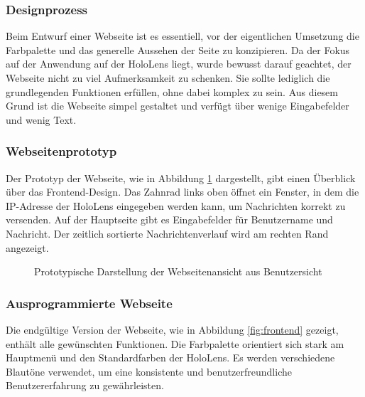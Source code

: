 \subsubsection{Designprozess}
Beim Entwurf einer Webseite ist es essentiell, vor der eigentlichen Umsetzung die Farbpalette und das generelle Aussehen
der Seite zu konzipieren. Da der Fokus auf der Anwendung auf der HoloLens liegt, wurde bewusst darauf geachtet, der
Webseite nicht zu viel Aufmerksamkeit zu schenken. Sie sollte lediglich die grundlegenden Funktionen erfüllen, ohne dabei
komplex zu sein. Aus diesem Grund ist die Webseite simpel gestaltet und verfügt über wenige Eingabefelder und wenig Text.

\subsubsection*{Webseitenprototyp}
Der Prototyp der Webseite, wie in Abbildung \ref{fig:protfrontend} dargestellt, gibt einen Überblick über das
Frontend-Design. Das Zahnrad links oben öffnet ein Fenster, in dem die IP-Adresse der HoloLens eingegeben werden kann,
um Nachrichten korrekt zu versenden. Auf der Hauptseite gibt es Eingabefelder für Benutzername und Nachricht. Der zeitlich
sortierte Nachrichtenverlauf wird am rechten Rand angezeigt.

\begin{figure}[H]
    \centering
    \caption{Prototypische Darstellung der Webseitenansicht aus Benutzersicht}
    \label{fig:protfrontend}
\end{figure}

\subsubsection*{Ausprogrammierte Webseite}
Die endgültige Version der Webseite, wie in Abbildung \ref{fig:frontend} gezeigt, enthält alle gewünschten Funktionen.
Die Farbpalette orientiert sich stark am Hauptmenü und den Standardfarben der HoloLens. Es werden verschiedene Blautöne
verwendet, um eine konsistente und benutzerfreundliche Benutzererfahrung zu gewährleisten.

